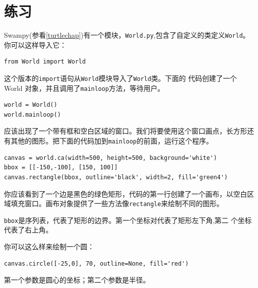 \section{练习}

\begin{ex}
\label{canvas}


Swampy(参看\ref{turtlechap})有一个模块，{\tt World.py},包含了自定义的类定义{\tt World}。你可以这样导入它：

\beforeverb
\begin{verbatim}
from World import World
\end{verbatim}
\afterverb

这个版本的{\tt import}语句从{\tt World}模块导入了{\tt World}类。下面的
代码创建了一个World 对象，并且调用了{\tt mainloop}方法，等待用户。

\beforeverb
\begin{verbatim}
world = World()
world.mainloop()
\end{verbatim}
\afterverb

应该出现了一个带有框和空白区域的窗口。我们将要使用这个窗口画点，长方形还有其他的图形。把下面的代码加到\verb"mainloop"的前面，运行这个程序。


\beforeverb
\begin{verbatim}
canvas = world.ca(width=500, height=500, background='white')
bbox = [[-150,-100], [150, 100]]
canvas.rectangle(bbox, outline='black', width=2, fill='green4')
\end{verbatim}
\afterverb

你应该看到了一个边是黑色的绿色矩形，代码的第一行创建了一个画布，以空白区域填充窗口。画布对象提供了一些方法像{\tt rectangle}来绘制不同的图形。


{\tt bbox}是序列表，代表了矩形的边界。第一个坐标对代表了矩形左下角,第二
个坐标代表了右上角。

你可以这么样来绘制一个圆：

\beforeverb
\begin{verbatim}
canvas.circle([-25,0], 70, outline=None, fill='red')
\end{verbatim}
\afterverb


第一个参数是圆心的坐标；第二个参数是半径。


\end{ex}
